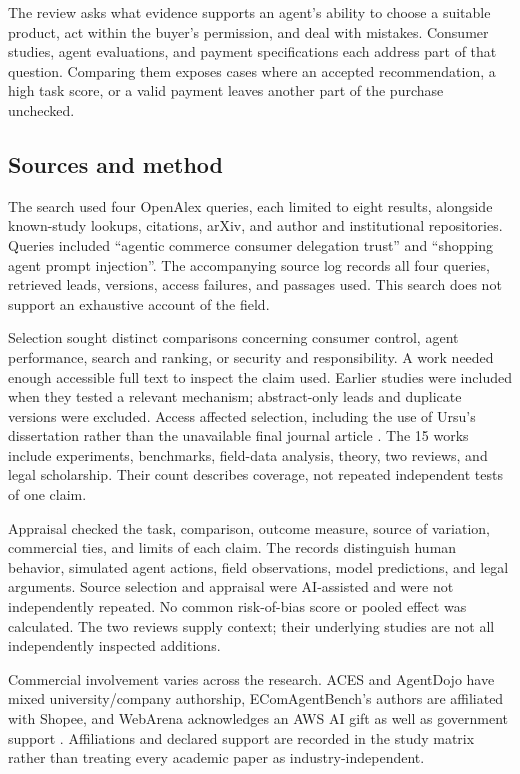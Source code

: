 \documentclass{article}
\begin{document}
The review asks what evidence supports an agent's ability to choose a suitable product, act within the buyer's permission, and deal with mistakes. Consumer studies, agent evaluations, and payment specifications each address part of that question. Comparing them exposes cases where an accepted recommendation, a high task score, or a valid payment leaves another part of the purchase unchecked.

\subsection{Sources and method}

The search used four OpenAlex queries, each limited to eight results, alongside known-study lookups, citations, arXiv, and author and institutional repositories. Queries included ``agentic commerce consumer delegation trust'' and ``shopping agent prompt injection''. The accompanying source log records all four queries, retrieved leads, versions, access failures, and passages used. This search does not support an exhaustive account of the field.

Selection sought distinct comparisons concerning consumer control, agent performance, search and ranking, or security and responsibility. A work needed enough accessible full text to inspect the claim used. Earlier studies were included when they tested a relevant mechanism; abstract-only leads and duplicate versions were excluded. Access affected selection, including the use of Ursu's dissertation rather than the unavailable final journal article \cite{ref36}. The 15 works include experiments, benchmarks, field-data analysis, theory, two reviews, and legal scholarship. Their count describes coverage, not repeated independent tests of one claim.

Appraisal checked the task, comparison, outcome measure, source of variation, commercial ties, and limits of each claim. The records distinguish human behavior, simulated agent actions, field observations, model predictions, and legal arguments. Source selection and appraisal were AI-assisted and were not independently repeated. No common risk-of-bias score or pooled effect was calculated. The two reviews supply context; their underlying studies are not all independently inspected additions.

Commercial involvement varies across the research. ACES and AgentDojo have mixed university/company authorship, EComAgentBench's authors are affiliated with Shopee, and WebArena acknowledges an AWS AI gift as well as government support \cite{ref17,ref18,ref34,ref37}. Affiliations and declared support are recorded in the study matrix rather than treating every academic paper as industry-independent.
\end{document}
